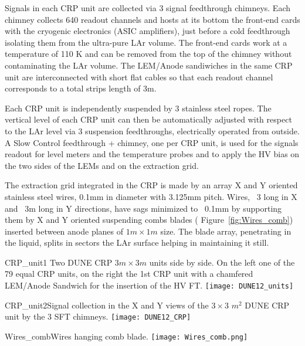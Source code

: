 Signals in each CRP unit are collected via 3 signal feedthrough chimneys. Each chimney collects 640 readout channels and hosts at its bottom the front-end cards with the cryogenic electronics (ASIC amplifiers), just before a cold feedthrough isolating them from the ultra-pure LAr volume. The front-end cards work at a temperature of 110 K and can be removed from the top of the chimney without contaminating the LAr volume. The LEM/Anode sandiwiches in the same CRP unit are interconnected with short flat cables so that each readout channel corresponds to a total strips length of 3m.
  
Each CRP unit is independently suspended  by 3 stainless steel ropes. The  vertical level of each CRP unit can then be automatically adjusted with respect to the LAr level via 3 suspension feedthroughs, electrically operated from outside. A Slow Control feedthrough + chimney, one per CRP unit, is used for the signals readout for level meters and the temperature probes and to apply the HV bias on the two sides of the LEMs  and on the extraction grid.

The extraction grid integrated in the CRP  is made by an array X and Y oriented stainless steel wires, 0.1mm in diameter with 3.125mm pitch.  Wires, ~3 long in X and ~3m long in Y directions, have sags minimized to ~0.1mm by supporting them by X and Y oriented suspending combs blades ( Figure~\ref{fig:Wires_comb}) inserted between anode planes of $1m \times 1m$ size. The blade array, penetrating in the liquid, splits in sectors the LAr surface helping in maintaining it still.

\begin{cdrfigure}{CRP_unit1}{ Two DUNE CRP $3m\times 3m$ units side by side. On the left one of the 79 equal CRP units, on the right the 1st CRP unit with a chamfered LEM/Anode Sandwich for the insertion of the HV FT.}
\texttt{[image: DUNE12\_units]}
\end{cdrfigure}

\begin{cdrfigure}{CRP_unit2}{Signal collection in the X and Y views of the  $3\times3$ $m^2$ DUNE CRP unit by the 3 SFT chimneys.}
\texttt{[image: DUNE12\_CRP]}
\end{cdrfigure}

\begin{cdrfigure}{Wires_comb}{Wires hanging comb blade.}
\texttt{[image: Wires\_comb.png]}
\end{cdrfigure}

